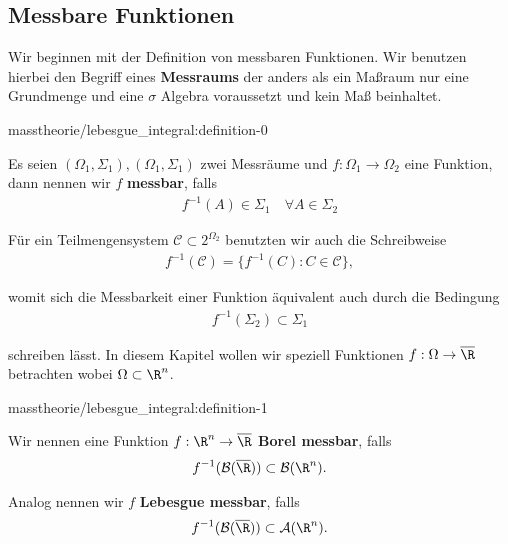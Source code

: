 \documentclass[letterpaper,10pt,german]{jupyterBook}
\begin{document}
\subsection{Messbare Funktionen}
\label{\detokenize{masstheorie/lebesgue_integral:messbare-funktionen}}
\par
Wir beginnen mit der Definition von messbaren Funktionen. Wir benutzen hierbei den Begriff eines \textbf{Messraums} der anders als ein Maßraum nur eine Grundmenge und eine \(\sigma\) Algebra voraussetzt und kein Maß beinhaltet.
\begin{definition}{}{masstheorie/lebesgue_integral:definition-0}



\par
Es seien \((\Omega_1,\Sigma_1), (\Omega_1,\Sigma_1)\) zwei Messräume und \(f:\Omega_1\to\Omega_2\) eine Funktion, dann nennen wir \(f\) \textbf{messbar}, falls
\begin{align*}
f^{-1}(A)\in\Sigma_1\quad\forall A\in\Sigma_2
\end{align*}\end{definition}

\par
Für ein Teilmengensystem \(\mathcal{C}\subset 2^{\Omega_2}\) benutzten wir auch die Schreibweise
\begin{align*}
f^{-1}(\mathcal{C}) = \{ f^{-1}(C): C\in\mathcal{C}\},
\end{align*}
\par
womit sich die Messbarkeit einer Funktion äquivalent auch durch die Bedingung
\begin{align*}
f^{-1}(\Sigma_2)\subset\Sigma_1
\end{align*}
\par
schreiben lässt. In diesem Kapitel wollen wir speziell Funktionen \(f:\Omega\to\overline{\R}\) betrachten wobei \(\Omega\subset\R^n\).
\begin{definition}{}{masstheorie/lebesgue_integral:definition-1}



\par
Wir nennen eine Funktion \(f:\R^n\to\overline{\R}\) \textbf{Borel messbar}, falls
\begin{align*}
f^{-1}(\mathcal{B}(\overline{\R}))\subset \mathcal{B}(\R^n).
\end{align*}
\par
Analog nennen wir \(f\) \textbf{Lebesgue messbar}, falls
\begin{align*}
f^{-1}(\mathcal{B}(\overline{\R}))\subset \mathcal{A}(\R^n).
\end{align*}\end{definition}
\end{document}
